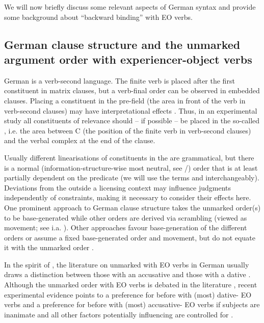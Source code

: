 \documentclass[output=paper,colorlinks,citecolor=brown]{langscibook}
\begin{document}
We will now briefly discuss some relevant aspects of German syntax and provide some background about \enquote{backward binding} with EO verbs.

\subsection{German clause structure and the unmarked argument order with experiencer-object verbs}
\label{sec:background_German:Masloch}

German is a verb-second language.
The finite verb is placed after the first constituent in matrix clauses, but a verb-final order can be observed in embedded clauses.
Placing a constituent in the pre-field (the area in front of the verb in verb-second clauses) may have interpretational effects \citep{frey_contrast_2006}. 
Thus, in an experimental study all constituents of relevance should -- if possible -- be placed in the so-called , i.e. the area between C (the position of the finite verb in verb-second clauses) and the verbal complex at the end of the clause.

Usually different linearisations of constituents in the  are grammatical, but there is a normal (information-structure-wise most neutral, see \citeauthor{hohle_explikationen_2019} \citeyear{b1ca882e12e014096a64e8713c144a59}/\citeyear{hohle_explikationen_2019}) order that is at least partially dependent on the predicate (we will use the terms  and  interchangeably).
Deviations from the  outside a licensing context may influence  judgments independently of  constraints, making it necessary to consider their effects here.
One prominent approach to German clause structure takes the unmarked order(s) to be base-generated while other orders are derived via scrambling (viewed as movement; see i.a. \citealp{frey_syntaktische_1993,haider_mittelfeld_2017}).
Other approaches favour base-generation of the different orders \parencite[i.a.][]{fanselow_features_2001} or assume a fixed base-generated order and movement, but do not equate it with the unmarked order \parencite[i.a.][]{mueller}.

In the spirit of \textcite{belletti_psych-verbs_1988}, the literature on unmarked  with EO verbs in German usually draws a distinction between those with an accusative  and those with a dative .
Although the unmarked order with EO verbs is debated in the literature \parencite[cf. i.a.][]{lenerz_zur_1977,scheepers_linking_2000,haider_scrambling_2003,ellsiepen_constraints_2018}, recent experimental evidence points to a preference for  before  with (most) dative- EO verbs and a preference for  before  with (most) accusative- EO verbs if subjects are inanimate and all other factors potentially influencing  are controlled for \citep{temme_verb_2016, masloch_not_2024}.
\end{document}
